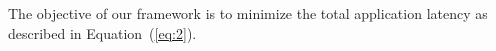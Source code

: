 




The objective of our framework is to minimize the total application
latency as described in Equation~(\ref{eq:2}).